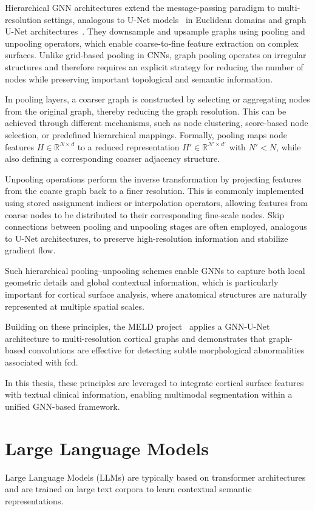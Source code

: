 \documentclass[FCD_GNN.tex]{subfiles}
\begin{document}
Hierarchical GNN architectures extend the message-passing paradigm to multi-resolution settings, analogous to U-Net models~\cite{Ronneberger2015UNet} in Euclidean domains and
graph U-Net architectures~\cite{Gao2019GraphUNet}. 
They downsample and upsample graphs using pooling and unpooling operators, which
enable coarse-to-fine feature extraction on complex surfaces. 
Unlike grid-based pooling in CNNs, graph pooling operates on irregular structures
and therefore requires an explicit strategy for reducing the number of nodes
while preserving important topological and semantic information.

In pooling layers, a coarser graph is constructed by selecting or aggregating nodes from the original graph, thereby reducing the graph resolution.
This can be achieved through different mechanisms, such as
node clustering, score-based node selection, or predefined hierarchical mappings.
Formally, pooling maps node features $H \in \mathbb{R}^{N \times d}$
to a reduced representation $H' \in \mathbb{R}^{N' \times d'}$ with $N' < N$,
while also defining a corresponding coarser adjacency structure.

Unpooling operations perform the inverse transformation by projecting features
from the coarse graph back to a finer resolution.
This is commonly implemented using stored assignment indices or interpolation operators,
allowing features from coarse nodes to be distributed to their corresponding fine-scale nodes.
Skip connections between pooling and unpooling stages are often employed,
analogous to U-Net architectures, to preserve high-resolution information
and stabilize gradient flow.

Such hierarchical pooling--unpooling schemes enable GNNs to capture
both local geometric details and global contextual information,
which is particularly important for cortical surface analysis,
where anatomical structures are naturally represented at multiple spatial scales.

Building on these principles, the MELD project~\cite{Ripart2025MELD} applies a
GNN-U-Net architecture to multi-resolution cortical graphs and demonstrates that
graph-based convolutions are effective for detecting subtle morphological
abnormalities associated with \ac{fcd}.  

In this thesis, these principles are leveraged to integrate cortical surface
features with textual clinical information, enabling multimodal segmentation
within a unified GNN-based framework.

\section{Large Language Models} 
Large Language Models (LLMs) are typically based on transformer architectures and are trained on large text corpora to learn contextual semantic representations.
\end{document}
